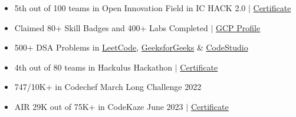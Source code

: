 \documentclass[letterpaper,11pt]{article}
\newcommand{\resumeItem}[1]{
  \item\small{
    {#1 \vspace{-2pt}}
  }
}
\newcommand{\resumeItemListStart}{\begin{itemize}}
\newcommand{\resumeItemListEnd}{\end{itemize}\vspace{-5pt}}
\begin{document}
    \begin{itemize}[leftmargin=0.15in, label={}]
    \resumeItemListStart
  \resumeItem{5th out of 100 teams in Open Innovation Field in IC HACK 2.0 $|$ \href{https://drive.google.com/file/d/1SeL0qU6O4hFTnG8Ef7F7ifKkHy5lRoSG/view?usp=sharing}{Certificate}}
   \resumeItem{Claimed 80+ Skill Badges and 400+ Labs Completed $|$ \href{https://www.cloudskillsboost.google/public_profiles/27c0ba2b-577b-4d32-a506-64591e89e383}{GCP Profile}}
  \resumeItem{500+ DSA Problems in \href{https://leetcode.com/tarunbisht-24/}{LeetCode}, \href{https://auth.geeksforgeeks.org/user/tarunbisht24}{GeeksforGeeks} \& \href{https://www.codingninjas.com/codestudio/profile/a5f5fd68-00b2-4d69-99c9-bfdcee24eee2}{CodeStudio}}
  \resumeItem{4th out of 80 teams in Hackulus Hackathon $|$ \href{https://drive.google.com/file/d/18ciyyMktMdTX3gtiTdu328mGsj4R-QYG/view?usp=sharing}{Certificate}}
  \resumeItem{747/10K+ in Codechef March Long Challenge 2022}
  \resumeItem{AIR 29K out of 75K+ in CodeKaze June 2023 $|$ \href{https://drive.google.com/file/d/1mMD2lqFVsxjVfZL1JmhHwPu7hafmTqpd/view?usp=sharing}{Certificate}}
  
    \resumeItemListEnd
    \end{itemize}




\end{document}
